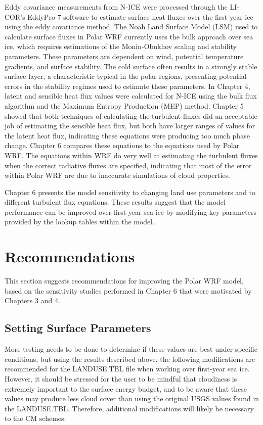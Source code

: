 Eddy covariance measurements from N-ICE were processed through the LI-COR’s EddyPro 7 software to estimate surface heat fluxes over the first-year ice using the eddy covariance method. The Noah Land Surface Model (LSM) used to calculate surface fluxes in Polar WRF currently uses the bulk approach over sea ice, which requires estimations of the Monin-Obukhov scaling and stability parameters. These parameters are dependent on wind, potential temperature gradients, and surface stability. The cold surface often results in a strongly stable surface layer, a characteristic typical in the polar regions, presenting potential errors in the stability regimes used to estimate these parameters. In Chapter 4, latent and sensible heat flux values were calculated for N-ICE using the bulk flux algorithm and the Maximum Entropy Production (MEP) method. Chapter 5 showed that both techniques of calculating the turbulent fluxes did an acceptable job of estimating the sensible heat flux, but both have larger ranges of values for the latent heat flux, indicating these equations were producing too much phase change. Chapter 6 compares these equations to the equations used by Polar WRF. The equations within WRF do very well at estimating the turbulent fluxes when the correct radiative fluxes are specified, indicating that most of the error within Polar WRF are due to inaccurate simulations of cloud properties. 

Chapter 6 presents the model sensitivity to changing land use parameters and to different turbulent flux equations. These results suggest that the model performance can be improved over first-year sea ice by modifying key parameters provided by the lookup tables within the model. 

\section{Recommendations}
This section suggests recommendations for improving the Polar WRF model, based on the sensitivity studies performed in Chapter 6 that were motivated by Chapters 3 and 4.

\subsection{Setting Surface Parameters}
More testing needs to be done to determine if these values are best under specific conditions, but using the results described above, the following modifications are recommended for the LANDUSE.TBL file when working over first-year sea ice. However, it should be stressed for the user to be mindful that cloudiness is extremely important to the surface energy budget, and to be aware that these values may produce less cloud cover than using the original USGS values found in the LANDUSE.TBL. Therefore, additional modifications will likely be necessary to the CM schemes.

